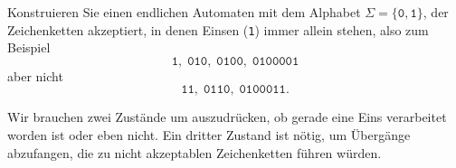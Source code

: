 Konstruieren Sie einen endlichen Automaten mit dem Alphabet
$\Sigma=\{\texttt{0},\texttt{1}\}$, der Zeichenketten akzeptiert, in denen
Einsen (\texttt{1}) immer allein stehen, also zum Beispiel
\[
\texttt{1},\;
\texttt{010},\;
\texttt{0100},\;
\texttt{0100001}
\]
aber nicht
\[
\texttt{11},\;
\texttt{0110},\;
\texttt{0100011}.
\]

\begin{loesung}
Wir brauchen zwei Zustände um auszudrücken, ob gerade eine Eins verarbeitet
worden ist oder eben nicht.
Ein dritter Zustand ist nötig, um Übergänge abzufangen, die zu nicht
akzeptablen Zeichenketten führen würden.
\begin{center}
\end{center}
\end{loesung}
